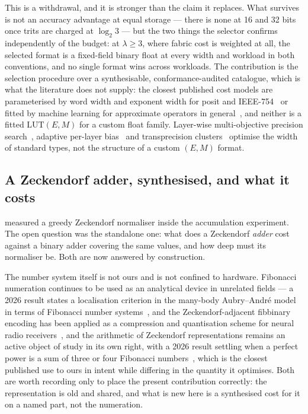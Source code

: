 This is a withdrawal, and it is stronger than the claim it replaces. What survives
is not an accuracy advantage at equal storage --- there is none at 16 and 32 bits
once trits are charged at $\log_2 3$ --- but the two things the selector confirms
independently of the budget: at $\lambda \ge 3$, where fabric cost is weighted at
all, the selected format is a fixed-field binary float at every width and
workload in both conventions, and no single format wins across workloads. The
contribution is the selection procedure over a synthesisable,
conformance-audited catalogue, which is what the literature does not
supply: the closest published cost models are parameterised by word width and
exponent width for posit and IEEE-754~\cite{forget2021comparing} or fitted by
machine learning for approximate operators in
general~\cite{sahoo2024axocs}, and neither is a fitted
$\mathrm{LUT}(E,M)$ for a custom float family. Layer-wise multi-objective
precision search~\cite{ho2019multiobjective}, adaptive per-layer
bias~\cite{tambe2020adaptivfloat} and transprecision
clusters~\cite{montagna2021transprecision} optimise the width of standard types,
not the structure of a custom $(E,M)$ format.

\subsection{A Zeckendorf adder, synthesised, and what it costs}
\label{sec:variantC}

 measured a greedy Zeckendorf normaliser inside the
accumulation experiment. The open question was the standalone one: what does a
Zeckendorf \emph{adder} cost against a binary adder covering the same values, and
how deep must its normaliser be. Both are now answered by construction.

The number system itself is not ours and is not confined to hardware. Fibonacci
numeration continues to be used as an analytical device in unrelated fields --- a
2026 result states a localisation criterion in the many-body Aubry--Andr\'e model in
terms of Fibonacci number systems~\cite{hetenyi2026fibonacci}, and the
Zeckendorf-adjacent fibbinary encoding has been applied as a compression and
quantisation scheme for neural radio receivers~\cite{fibbinary}, and
the arithmetic of Zeckendorf representations remains an active object of study in
its own right, with a 2026 result settling when a perfect power is a sum of three
or four Fibonacci numbers~\cite{earplynch2026powers},
which is the closest published use to ours in intent while differing in the
quantity it optimises. Both are worth
recording only to place the present contribution correctly: the representation is
old and shared, and what is new here is a synthesised cost for it on a named part,
not the numeration.

